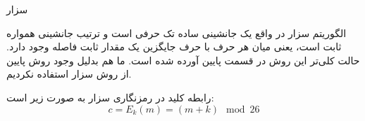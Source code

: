 \SubProblem
{سزار}
{
الگوریتم سزار در واقع یک جانشینی ساده تک حرفی است و ترتیب جانشینی همواره ثابت است، یعنی میان هر حرف با حرف جایگزین یک مقدار ثابت فاصله وجود دارد.
حالت کلی‌تر این روش در قسمت پایین آورده شده است. ما هم بدلیل وجود روش پایین از روش سزار استفاده نکردیم.

رابطه کلید در رمزنگاری سزار به صورت زیر است:
\begin{equation*}
    c = E_k(m) = (m + k) \mod 26
\end{equation*}
}
